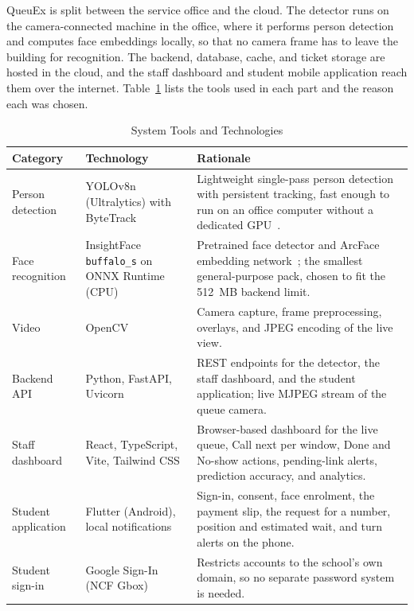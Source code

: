 \documentclass{research}
\newcommand{\sysname}{QueuEx}
\begin{document}
\sysname{} is split between the service office and the cloud. The
detector runs on the camera-connected machine in the office, where it
performs person detection and computes face embeddings locally, so that
no camera frame has to leave the building for recognition. The backend,
database, cache, and ticket storage are hosted in the cloud, and the
staff dashboard and student mobile application reach them over the
internet. Table~\ref{tab:tools} lists the tools used in each part and
the reason each was chosen.

\begin{table}[!htbp]
  \caption{System Tools and Technologies}
  \label{tab:tools}
  \centering
  \footnotesize
  \renewcommand{\arraystretch}{1.05}
  \begin{tabular}{p{2.3cm} p{3.4cm} p{7.4cm}}
    \toprule
    \textbf{Category} & \textbf{Technology} & \textbf{Rationale} \\
    \midrule
    Person detection & YOLOv8n (Ultralytics) with ByteTrack &
      Lightweight single-pass person detection with persistent tracking,
      fast enough to run on an office computer without a dedicated
      GPU~\cite{jocher2023,zhang2022bytetrack}. \\
    Face recognition & InsightFace \texttt{buffalo\_s} on ONNX Runtime (CPU) &
      Pretrained face detector and ArcFace embedding
      network~\cite{deng2019arcface}; the smallest general-purpose pack,
      chosen to fit the 512~MB backend limit. \\
    Video & OpenCV &
      Camera capture, frame preprocessing, overlays, and JPEG encoding of
      the live view. \\
    Backend API & Python, FastAPI, Uvicorn &
      REST endpoints for the detector, the staff dashboard, and the
      student application; live MJPEG stream of the queue camera. \\
    Staff dashboard & React, TypeScript, Vite, Tailwind CSS &
      Browser-based dashboard for the live queue, Call next per window,
      Done and No-show actions, pending-link alerts, prediction accuracy,
      and analytics. \\
    Student application & Flutter (Android), local notifications &
      Sign-in, consent, face enrolment, the payment slip, the request for
      a number, position and estimated wait, and turn alerts on the
      phone. \\
    Student sign-in & Google Sign-In (NCF Gbox) &
      Restricts accounts to the school's own domain, so no separate
      password system is needed. \\

\end{tabular}
\end{table}
\end{document}
